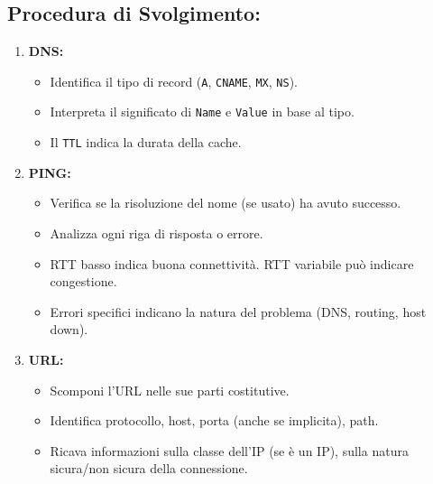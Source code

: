 \subsection{Procedura di Svolgimento:}
\begin{enumerate}
    \item \textbf{DNS:}
    \begin{itemize}
        \item Identifica il tipo di record (\texttt{A}, \texttt{CNAME}, \texttt{MX}, \texttt{NS}).
        \item Interpreta il significato di \texttt{Name} e \texttt{Value} in base al tipo.
        \item Il \texttt{TTL} indica la durata della cache.
    \end{itemize}
    \item \textbf{PING:}
    \begin{itemize}
        \item Verifica se la risoluzione del nome (se usato) ha avuto successo.
        \item Analizza ogni riga di risposta o errore.
        \item RTT basso indica buona connettività. RTT variabile può indicare congestione.
        \item Errori specifici indicano la natura del problema (DNS, routing, host down).
    \end{itemize}
    \item \textbf{URL:}
    \begin{itemize}
        \item Scomponi l'URL nelle sue parti costitutive.
        \item Identifica protocollo, host, porta (anche se implicita), path.
        \item Ricava informazioni sulla classe dell'IP (se è un IP), sulla natura sicura/non sicura della connessione.
    \end{itemize}
\end{enumerate}

